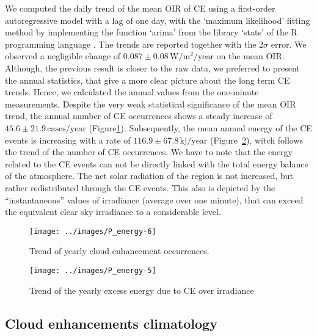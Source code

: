 \documentclass[preprint, 5p,
authoryear]{elsarticle} %
\begin{document}
We computed the daily trend of the mean OIR of CE using a first-order
autoregressive model with a lag of one day, with the `maximum
likelihood' fitting method \citep{Gardner1980, Jones1980} by
implementing the function `arima' from the library `stats' of the R
programming language \citep{RCT2023}. The trends are reported together
with the \(2\sigma\) error. We observed a negligible change of
\(0.087\pm 0.08\,\text{W}/\text{m}^2/\text{year}\) on the mean OIR.
Although, the previous result is closer to the raw data, we preferred to
present the annual statistics, that give a more clear picture about the
long term CE trends. Hence, we calculated the annual values from the
one-minute measurements. Despite the very weak statistical significance
of the mean OIR trend, the annual number of CE occurrences shows a
steady increase of \(45.6\pm 21.9\,\text{cases}/\text{year}\)
(Figure\nobreakspace{}\ref{fig:P-energy-N}). Subsequently, the mean
annual energy of the CE events is increasing with a rate of
\(116.9\pm 67.8\,\text{kj}/\text{year}\)
(Figure~\ref{fig:P-energy-sum}), witch follows the trend of the number
of CE occurrences. We have to note that the energy related to the CE
events can not be directly linked with the total energy balance of the
atmosphere. The net solar radiation of the region is not increased, but
rather redistributed through the CE events. This also is depicted by the
``instantaneous'' values of irradiance (average over one minute), that
can exceed the equivalent clear sky irradiance to a considerable level.

\begin{figure}

{\centering \texttt{[image: ../images/P\_energy-6]} 

}

\caption{Trend of yearly cloud enhancement occurrences.}\label{fig:P-energy-N}
\end{figure}

\begin{figure}

{\centering \texttt{[image: ../images/P\_energy-5]} 

}

\caption{Trend of the yearly excess energy due to CE over irradiance}\label{fig:P-energy-sum}
\end{figure}

\hypertarget{cloud-enhancements-climatology}{%
\subsection{Cloud enhancements
climatology}\label{cloud-enhancements-climatology}}
\end{document}
